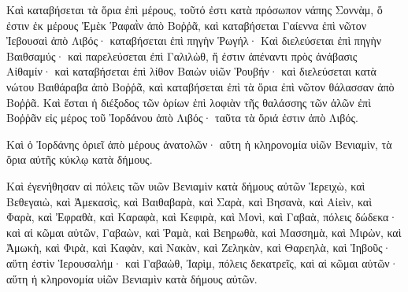 {Καὶ καταβήσεται τὰ ὅρια ἐπὶ μέρους, τοῦτό ἐστι κατὰ πρόσωπον νάπης Σοννὰμ, ὅ ἐστιν ἐκ μέρους Ἐμὲκ Ῥαφαῒν ἀπὸ Βοῤῥᾶ, καὶ καταβήσεται Γαίεννα ἐπὶ νῶτον Ἰεβουσαὶ ἀπὸ Λιβός· καταβήσεται ἐπὶ πηγὴν Ῥωγήλ·
Καὶ διελεύσεται ἐπὶ πηγὴν Βαιθσαμύς· καὶ παρελεύσεται ἐπὶ Γαλιλὼθ, ἥ ἐστιν ἀπέναντι πρὸς ἀνάβασις Αἰθαμίν· καὶ καταβήσεται ἐπὶ λίθον Βαιὼν υἱῶν Ῥουβήν·
καὶ διελεύσεται κατὰ νώτου Βαιθάραβα ἀπὸ Βοῤῥᾶ, καὶ καταβήσεται ἐπὶ τὰ ὅρια ἐπὶ νῶτον θάλασσαν ἀπὸ Βοῤῥᾶ.
Καὶ ἔσται ἡ διέξοδος τῶν ὁρίων ἐπὶ λοφιὰν τῆς θαλάσσης τῶν ἁλῶν ἐπὶ Βοῤῥᾶν εἰς μέρος τοῦ Ἰορδάνου ἀπὸ Λιβός· ταῦτα τὰ ὅριά ἐστιν ἀπὸ Λιβός.
\par }{\PP {}Καὶ ὁ Ἰορδάνης ὁριεῖ ἀπὸ μέρους ἀνατολῶν· αὕτη ἡ κληρονομία υἱῶν Βενιαμὶν, τὰ ὅρια αὐτῆς κύκλῳ κατὰ δήμους.
\par }{\PP {}Καὶ ἐγενήθησαν αἱ πόλεις τῶν υιῶν Βενιαμὶν κατὰ δήμους αὐτῶν Ἱερειχὼ, καὶ Βεθεγαιὼ, καὶ Ἀμεκασὶς,
καὶ Βαιθαβαρὰ, καὶ Σαρὰ, καὶ Βησανὰ,
καὶ Αἰεὶν, καὶ Φαρὰ, καὶ Ἐφραθὰ,
καὶ Καραφὰ, καὶ Κεφιρὰ, καὶ Μονὶ, καὶ Γαβαὰ, πόλεις δώδεκα· καὶ αἱ κῶμαι αὐτῶν,
Γαβαὼν, καὶ Ῥαμὰ, καὶ Βεηρωθὰ,
καὶ Μασσημὰ, καὶ Μιρὼν, καὶ Ἀμωκὴ,
καὶ Φιρὰ, καὶ Καφὰν, καὶ Νακὰν, καὶ Ζεληκὰν, καὶ Θαρεηλὰ,
καὶ Ἰηβοῦς· αὕτη ἐστὶν Ἱερουσαλήμ· καὶ Γαβαὼθ, Ἰαρὶμ, πόλεις δεκατρεῖς, καὶ αἱ κῶμαι αὐτῶν· αὕτη ἡ κληρονομία υἱῶν Βενιαμὶν κατὰ δήμους αὐτῶν.

}
